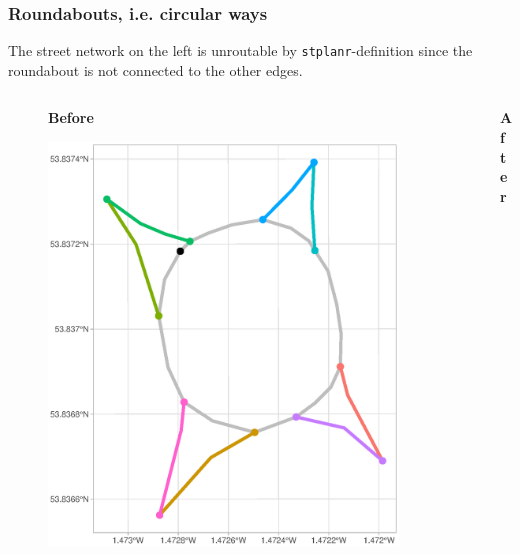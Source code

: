 \documentclass[c,10pt,pdftex]{beamer}
\begin{document}
\begin{frame}
  \frametitle{Roundabouts, i.e. circular ways}
  \vspace{-0.25cm}
  The street network on the left is unroutable by \texttt{stplanr}-definition since the roundabout is not connected to the other edges.  
  \vspace{-0.25cm}
  \begin{columns}
    \begin{column}{0.5\linewidth}
      \begin{figure}
      \centering
      \large \textbf{Before} \par \medskip
      \includegraphics[width = 0.9\linewidth, trim = {0 0 0 4cm}, clip]{images/roundabout1}
      \end{figure}
    \end{column}
    \begin{column}{0.5\linewidth}
      \begin{figure}
      \centering
      \large \textbf{After} \par \medskip

\end{figure}
\end{column}
\end{columns}
\end{frame}
\end{document}
